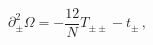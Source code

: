 \begin{equation}
\partial_{\pm}^2 \Omega = -\frac{12}{N} T_{\pm \pm} -t_\pm\, ,
\label{eq++eom}
\end{equation}

